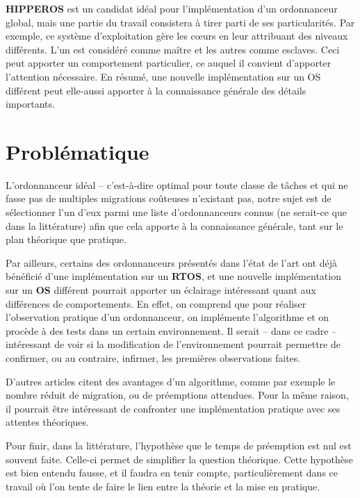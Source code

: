 \documentclass[11pt,a4paper,oneside]{report}
\newcommand{\customhighlight}[1]{{\textbf{#1}}}
\begin{document}
	\customhighlight{HIPPEROS} est un candidat idéal pour l'implémentation d'un ordonnanceur 
	global, mais une partie du travail consistera à tirer parti de ses particularités. 
	Par exemple, ce système d'exploitation gère les c\oe{}urs en leur attribuant des 
	niveaux différents. L'un est considéré comme \og maître \fg{} et les autres comme \og esclaves\fg{}. 
	Ceci peut apporter un comportement particulier, ce auquel il convient d'apporter 
	l'attention nécessaire. En résumé, une nouvelle implémentation sur un OS différent 
	peut elle-aussi apporter à la connaissance générale des détails importants.
	
	
	\section{Problématique}
	L'ordonnanceur idéal -- c'est-à-dire optimal pour toute classe de tâches et 
	qui ne fasse pas de multiples migrations coûteuses n'existant pas, 
	notre sujet est de sélectionner l'un d'eux parmi une liste 
	d'ordonnanceurs connus (ne serait-ce que dans la littérature) afin que cela apporte 
	à la connaissance générale, tant sur le plan théorique que pratique.\medskip
	
	Par ailleurs, certains des ordonnanceurs présentés dans l'état de l'art 
	ont déjà bénéficié d'une implémentation sur un \customhighlight{RTOS}, et une nouvelle 
	implémentation sur un \customhighlight{OS} différent pourrait apporter un éclairage intéressant quant 
	aux différences de comportements.
	En effet, on comprend que pour réaliser l'observation pratique d'un ordonnanceur, 
	on implémente l'algorithme et on procède à des tests dans un certain environnement. 
	Il serait -- dans ce cadre -- intéressant de voir si la modification de l'environnement 
	pourrait permettre de confirmer, ou au contraire, infirmer, les premières observations faites.
	
	
	D'autres articles citent des avantages d'un algorithme, comme par exemple 
	le nombre réduit de migration, ou de préemptions attendues. Pour la même raison, 
	il pourrait être intéressant de confronter une implémentation pratique avec ses attentes 
	théoriques.\medskip
	
	Pour finir, dans la littérature, l'hypothèse que le temps de préemption est nul 
	est souvent faite. Celle-ci permet de simplifier la question théorique. 
	Cette hypothèse est bien entendu fausse, et il faudra en tenir compte, 
	particulièrement dans ce travail où l'on tente de faire 
	le lien entre la théorie et la mise en pratique.\medskip
	
\end{document}
